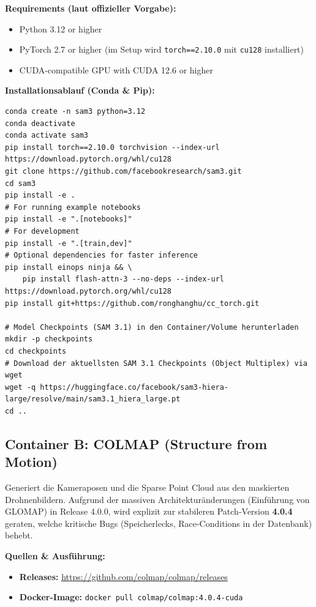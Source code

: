 \documentclass[12pt,a4paper]{article}
\begin{document}
\textbf{Requirements (laut offizieller Vorgabe):}
\begin{itemize}[noitemsep]
    \item Python 3.12 or higher
    \item PyTorch 2.7 or higher (im Setup wird \texttt{torch==2.10.0} mit \texttt{cu128} installiert)
    \item CUDA-compatible GPU with CUDA 12.6 or higher
\end{itemize}

\textbf{Installationsablauf (Conda \& Pip):}
\begin{verbatim}
conda create -n sam3 python=3.12
conda deactivate
conda activate sam3
pip install torch==2.10.0 torchvision --index-url https://download.pytorch.org/whl/cu128
git clone https://github.com/facebookresearch/sam3.git
cd sam3
pip install -e .
# For running example notebooks
pip install -e ".[notebooks]"
# For development
pip install -e ".[train,dev]"
# Optional dependencies for faster inference
pip install einops ninja && \
    pip install flash-attn-3 --no-deps --index-url https://download.pytorch.org/whl/cu128
pip install git+https://github.com/ronghanghu/cc_torch.git

# Model Checkpoints (SAM 3.1) in den Container/Volume herunterladen
mkdir -p checkpoints
cd checkpoints
# Download der aktuellsten SAM 3.1 Checkpoints (Object Multiplex) via wget
wget -q https://huggingface.co/facebook/sam3-hiera-large/resolve/main/sam3.1_hiera_large.pt
cd ..
\end{verbatim}

\subsection*{Container B: COLMAP (Structure from Motion)}
Generiert die Kameraposen und die Sparse Point Cloud aus den maskierten Drohnenbildern.
Aufgrund der massiven Architekturänderungen (Einführung von GLOMAP) in Release 4.0.0, wird explizit zur stabileren Patch-Version \textbf{4.0.4} geraten, welche kritische Bugs (Speicherlecks, Race-Conditions in der Datenbank) behebt.

\textbf{Quellen \& Ausführung:}
\begin{itemize}[noitemsep]
    \item \textbf{Releases:} \url{https://github.com/colmap/colmap/releases}
    \item \textbf{Docker-Image:} \texttt{docker pull colmap/colmap:4.0.4-cuda}
\end{itemize}
\end{document}
